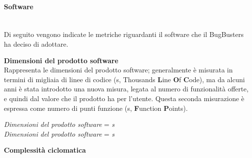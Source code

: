 \paragraph{Software}\mbox{}\\
Di seguito vengono indicate le metriche riguardanti il software che il  BugBusters ha deciso di adottare.

\textbf{Dimensioni del prodotto software}\\

Rappresenta le dimensioni del prodotto software; generalmente \`e misurata in termini di migliaia di linee di codice (s, Thousands \textbf{L}ine \textbf{O}f \textbf{C}ode), ma da alcuni anni è stata introdotto una nuova misura, legata al numero di funzionalità offerte, e quindi dal valore che il prodotto ha per l'utente. Questa seconda misurazione è espressa come numero di punti funzione (s, \textbf{F}unction \textbf{P}oints). \\
\begin{center}
	\textit{Dimensioni del prodotto software} = \textit{s} \\
	\textit{Dimensioni del prodotto software} = \textit{s} 
\end{center}

\textbf{Complessità ciclomatica}\\

